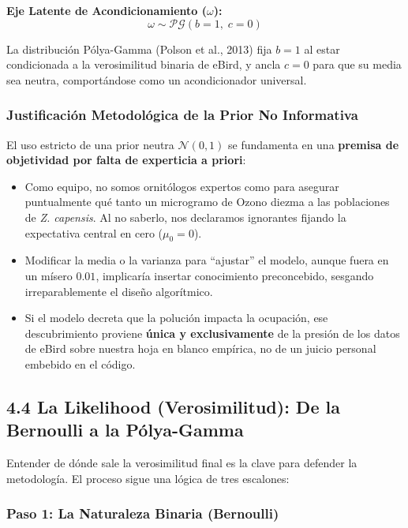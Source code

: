 \documentclass[12pt]{article}
\begin{document}
\textbf{Eje Latente de Acondicionamiento ($\omega$):}
\begin{equation}
  \omega \sim \mathcal{PG}(b=1,\; c=0)
\end{equation}

La distribución Pólya-Gamma (Polson et al., 2013) fija $b=1$ al estar condicionada a la verosimilitud binaria de eBird, y ancla $c=0$ para que su media sea neutra, comportándose como un acondicionador universal.

\subsubsection*{Justificación Metodológica de la Prior No Informativa}

El uso estricto de una prior neutra $\mathcal{N}(0, 1)$ se fundamenta en una \textbf{premisa de objetividad por falta de experticia a priori}:

\begin{itemize}
  \item Como equipo, no somos ornitólogos expertos como para asegurar puntualmente qué tanto un microgramo de Ozono diezma a las poblaciones de \textit{Z. capensis}. Al no saberlo, nos declaramos ignorantes fijando la expectativa central en cero ($\mu_0 = 0$).
  \item Modificar la media o la varianza para ``ajustar'' el modelo, aunque fuera en un mísero $0.01$, implicaría insertar conocimiento preconcebido, sesgando irreparablemente el diseño algorítmico.
  \item Si el modelo decreta que la polución impacta la ocupación, ese descubrimiento proviene \textbf{única y exclusivamente} de la presión de los datos de eBird sobre nuestra hoja en blanco empírica, no de un juicio personal embebido en el código.
\end{itemize}

\subsection*{4.4 La Likelihood (Verosimilitud): De la Bernoulli a la Pólya-Gamma}

Entender de dónde sale la verosimilitud final es la clave para defender la metodología. El proceso sigue una lógica de tres escalones:

\subsubsection*{Paso 1: La Naturaleza Binaria (Bernoulli)}
\end{document}
